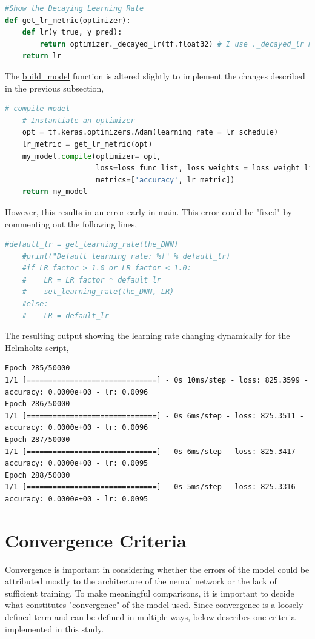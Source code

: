 \documentclass[a4paper, 12pt]{report}
\begin{document}
\begin{center}
\begin{lstlisting}[language=python]
#Show the Decaying Learning Rate
def get_lr_metric(optimizer):
    def lr(y_true, y_pred):
        return optimizer._decayed_lr(tf.float32) # I use ._decayed_lr method instead of .lr
    return lr
\end{lstlisting}
$$$$
The \url{build_model} function is altered slightly to implement the changes described in the previous subsection,
\begin{lstlisting}[language=python]
    # compile model
    # Instantiate an optimizer
    opt = tf.keras.optimizers.Adam(learning_rate = lr_schedule)
    lr_metric = get_lr_metric(opt)
    my_model.compile(optimizer= opt,
                     loss=loss_func_list, loss_weights = loss_weight_list,
                     metrics=['accuracy', lr_metric])
    return my_model
\end{lstlisting}
$$$$
However, this results in an error early in \url{main}. This error could be "fixed" by commenting out the following lines,
\begin{lstlisting}[language=python]
    #default_lr = get_learning_rate(the_DNN)
    #print("Default learning rate: %f" % default_lr)
    #if LR_factor > 1.0 or LR_factor < 1.0:
    #    LR = LR_factor * default_lr
    #    set_learning_rate(the_DNN, LR)
    #else:
    #    LR = default_lr
\end{lstlisting}
$$$$
The resulting output showing the learning rate changing dynamically for the Helmholtz script,
\begin{lstlisting}
Epoch 285/50000
1/1 [==============================] - 0s 10ms/step - loss: 825.3599 - accuracy: 0.0000e+00 - lr: 0.0096
Epoch 286/50000
1/1 [==============================] - 0s 6ms/step - loss: 825.3511 - accuracy: 0.0000e+00 - lr: 0.0096
Epoch 287/50000
1/1 [==============================] - 0s 6ms/step - loss: 825.3417 - accuracy: 0.0000e+00 - lr: 0.0095
Epoch 288/50000
1/1 [==============================] - 0s 5ms/step - loss: 825.3316 - accuracy: 0.0000e+00 - lr: 0.0095
\end{lstlisting}
\section{Convergence Criteria}

Convergence is important in considering whether the errors of the model could be attributed mostly to the architecture of the neural network or the lack of sufficient training. To make meaningful comparisons, it is important to decide what constitutes "convergence" of the model used. Since convergence is a loosely defined term and can be defined in multiple ways, below describes one criteria implemented in this study.

\end{center}
\end{document}
